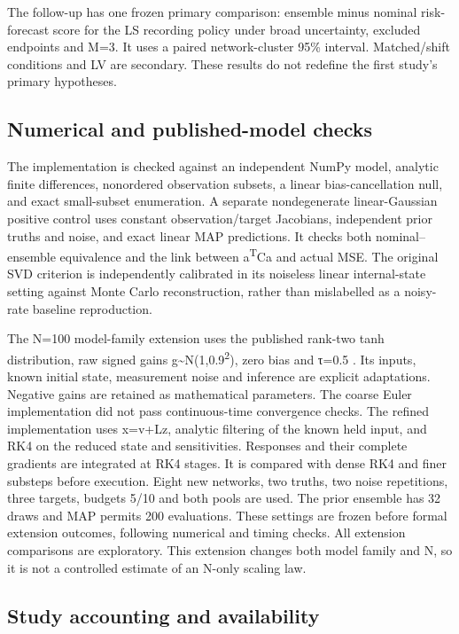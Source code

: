 The follow-up has one frozen primary comparison: ensemble minus nominal risk-forecast score for the LS recording policy under broad uncertainty, excluded endpoints and M=3. It uses a paired network-cluster 95\% interval. Matched/shift conditions and LV are secondary. These results do not redefine the first study's primary hypotheses.

\subsection{Numerical and published-model checks}

The implementation is checked against an independent NumPy model, analytic finite differences, nonordered observation subsets, a linear bias-cancellation null, and exact small-subset enumeration. A separate nondegenerate linear-Gaussian positive control uses constant observation/target Jacobians, independent prior truths and noise, and exact linear MAP predictions. It checks both nominal--ensemble equivalence and the link between a\textsuperscript{T}Ca and actual MSE. The original SVD criterion is independently calibrated in its noiseless linear internal-state setting against Monte Carlo reconstruction, rather than mislabelled as a noisy-rate baseline reproduction.

The N=100 model-family extension uses the published rank-two tanh distribution, raw signed gains g\textasciitilde N(1,0.9\textsuperscript{2}), zero bias and τ=0.5 \cite{ref05}. Its inputs, known initial state, measurement noise and inference are explicit adaptations. Negative gains are retained as mathematical parameters. The coarse Euler implementation did not pass continuous-time convergence checks. The refined implementation uses x=v+Lz, analytic filtering of the known held input, and RK4 on the reduced state and sensitivities. Responses and their complete gradients are integrated at RK4 stages. It is compared with dense RK4 and finer substeps before execution. Eight new networks, two truths, two noise repetitions, three targets, budgets 5/10 and both pools are used. The prior ensemble has 32 draws and MAP permits 200 evaluations. These settings are frozen before formal extension outcomes, following numerical and timing checks. All extension comparisons are exploratory. This extension changes both model family and N, so it is not a controlled estimate of an N-only scaling law.

\subsection{Study accounting and availability}

